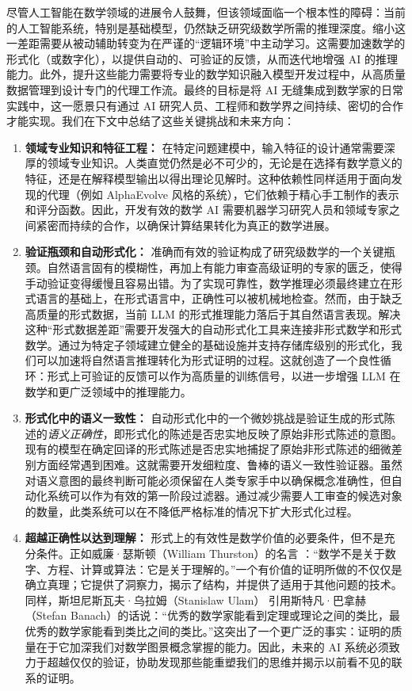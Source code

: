 \documentclass[11pt]{article}
\numberwithin{equation}{section}
\begin{document}
尽管人工智能在数学领域的进展令人鼓舞，但该领域面临一个根本性的障碍：当前的人工智能系统，特别是基础模型，仍然缺乏研究级数学所需的推理深度。缩小这一差距需要从被动辅助转变为在严谨的“逻辑环境”中主动学习。这需要加速数学的形式化（或数字化），以提供自动的、可验证的反馈，从而迭代地增强 AI 的推理能力。此外，提升这些能力需要将专业的数学知识融入模型开发过程中，从高质量数据管理到设计专门的代理工作流。最终的目标是将 AI 无缝集成到数学家的日常实践中，这一愿景只有通过 AI 研究人员、工程师和数学界之间持续、密切的合作才能实现。我们在下文中总结了这些关键挑战和未来方向：

\begin{enumerate}
    \item \textbf{领域专业知识和特征工程：} 在特定问题建模中，输入特征的设计通常需要深厚的领域专业知识。人类直觉仍然是必不可少的，无论是在选择有数学意义的特征，还是在解释模型输出以得出理论见解时。这种依赖性同样适用于面向发现的代理（例如 AlphaEvolve 风格的系统），它们依赖于精心手工制作的表示和评分函数。因此，开发有效的数学 AI 需要机器学习研究人员和领域专家之间紧密而持续的合作，以确保计算结果转化为真正的数学进展。

    \item \textbf{验证瓶颈和自动形式化：} 准确而有效的验证构成了研究级数学的一个关键瓶颈。自然语言固有的模糊性，再加上有能力审查高级证明的专家的匮乏，使得手动验证变得缓慢且容易出错。为了实现可靠性，数学推理必须最终建立在形式语言的基础上，在形式语言中，正确性可以被机械地检查。然而，由于缺乏高质量的形式数据，当前 LLM 的形式推理能力落后于其自然语言表现。解决这种“形式数据差距”需要开发强大的自动形式化工具来连接非形式数学和形式数学。通过为特定子领域建立健全的基础设施并支持存储库级别的形式化，我们可以加速将自然语言推理转化为形式证明的过程。这就创造了一个良性循环：形式上可验证的反馈可以作为高质量的训练信号，以进一步增强 LLM 在数学和更广泛领域中的推理能力。

    \item \textbf{形式化中的语义一致性：} 自动形式化中的一个微妙挑战是验证生成的形式陈述的\emph{语义正确性}，即形式化的陈述是否忠实地反映了原始非形式陈述的意图。现有的模型在确定回译的形式陈述是否忠实地捕捉了原始非形式陈述的细微差别方面经常遇到困难。这就需要开发细粒度、鲁棒的语义一致性验证器。虽然对语义意图的最终判断可能必须保留在人类专家手中以确保概念准确性，但自动化系统可以作为有效的第一阶段过滤器。通过减少需要人工审查的候选对象的数量，此类系统可以在不降低严格标准的情况下扩大形式化过程。

    \item \textbf{超越正确性以达到理解：} 形式上的有效性是数学价值的必要条件，但不是充分条件。正如威廉·瑟斯顿（William Thurston）的名言 \cite{c7da7d34-de5b-3a8d-8096-59d6b94e9a82}：“数学不是关于数字、方程、计算或算法：它是关于理解的。”一个有价值的证明所做的不仅仅是确立真理；它提供了洞察力，揭示了结构，并提供了适用于其他问题的技术。同样，斯坦尼斯瓦夫·乌拉姆（Stanislaw Ulam）\cite{ulam1976adventures} 引用斯特凡·巴拿赫（Stefan Banach）的话说：“优秀的数学家能看到定理或理论之间的类比，最优秀的数学家能看到类比之间的类比。”这突出了一个更广泛的事实：证明的质量在于它加深我们对数学图景概念掌握的能力。因此，未来的 AI 系统必须致力于超越仅仅的验证，协助发现那些能重塑我们的思维并揭示以前看不见的联系的证明。


\end{enumerate}
\end{document}
